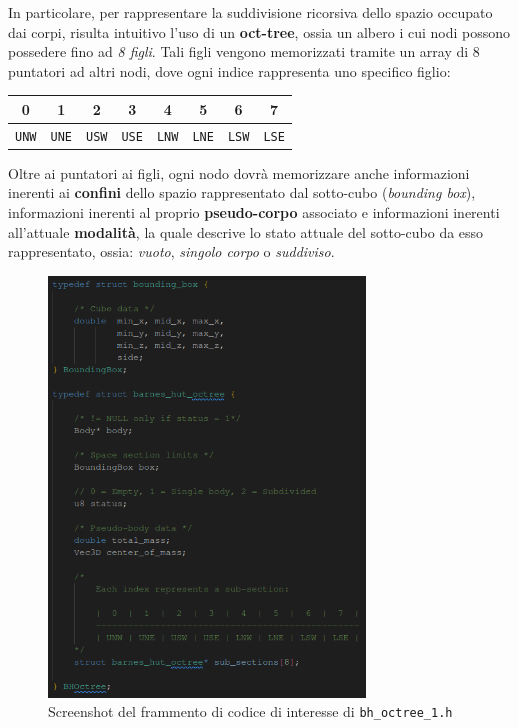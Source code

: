 \documentclass[12pt]{report}
\begin{document}
    In particolare, per rappresentare la suddivisione ricorsiva dello spazio occupato dai corpi, risulta intuitivo l'uso di un \textbf{oct-tree}, ossia un albero i cui nodi possono possedere fino ad \textit{8 figli}. Tali figli vengono memorizzati tramite un array di 8 puntatori ad altri nodi, dove ogni indice rappresenta uno specifico figlio:
    \begin{center}
        \begin{tabular}{c | c | c | c | c | c | c | c}
            \textbf{0} & \textbf{1} & \textbf{2} & \textbf{3} & \textbf{4} & \textbf{5} & \textbf{6} & \textbf{7}\\
            \hline
            \texttt{UNW} & \texttt{UNE} & \texttt{USW} & \texttt{USE} & \texttt{LNW} & \texttt{LNE} & \texttt{LSW} & \texttt{LSE}
        \end{tabular}
    \end{center}

    Oltre ai puntatori ai figli, ogni nodo dovrà memorizzare anche informazioni inerenti ai \textbf{confini} dello spazio rappresentato dal sotto-cubo (\textit{bounding box}), informazioni inerenti al proprio \textbf{pseudo-corpo} associato e informazioni inerenti all'attuale \textbf{modalità}, la quale descrive lo stato attuale del sotto-cubo da esso rappresentato, ossia: \textit{vuoto}, \textit{singolo corpo} o \textit{suddiviso}.

    \begin{figure}[H]
        \centering
        \includegraphics[width=0.75\textwidth]{images/bhoctree.png}
        \caption{Screenshot del frammento di codice di interesse di \texttt{bh\_octree\_1.h}}
        \label{fig:bhoctree_1}
    \end{figure}
\end{document}
